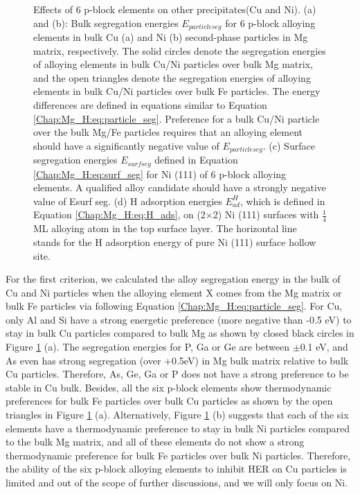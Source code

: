 \begin{figure}[!ht]
\caption[Effects of 6 p-block elements on other precipitates(Cu and Ni).]{Effects of 6 p-block elements on other precipitates(Cu and Ni). (a) and (b): Bulk segregation energies $E_{particle seg}$ for 6 p-block alloying elements in bulk Cu (a) and Ni (b) second-phase particles in Mg matrix, respectively. The solid circles denote the segregation energies of alloying elements in bulk Cu/Ni particles over bulk Mg matrix, and the open triangles denote the segregation energies of alloying elements in bulk Cu/Ni particles over bulk Fe particles. The energy differences are defined in equations similar to Equation \ref{Chap:Mg_H:eq:particle_seg}. Preference for a bulk Cu/Ni particle over the bulk Mg/Fe particles requires that an alloying element should have a significantly negative value of $E_{particle seg}$. (c) Surface segregation energies $E_{surf seg}$ defined in Equation \ref{Chap:Mg_H:eq:surf_seg} for Ni (111) of 6 p-block alloying elements. A qualified alloy candidate should have a strongly negative value of Esurf seg. (d) H adsorption energies $E_{ad}^H$, which is defined in Equation \ref{Chap:Mg_H:eq:H_ads}, on (2$\times$2) Ni (111) surfaces with $\frac{1}{4}$ \ac{ML} alloying atom in the top surface layer. The horizontal line stands for the H adsorption energy of pure Ni (111) surface hollow site.}
  \label{Chap:Mg_H:fig12}
\end{figure}
\endgroup

For the first criterion, we calculated the alloy segregation energy in the bulk of Cu and Ni particles when the alloying element X comes from the Mg matrix or bulk Fe particles via following Equation \ref{Chap:Mg_H:eq:particle_seg}. For Cu, only Al and Si have a strong energetic preference (more negative than -0.5 eV) to stay in bulk Cu particles compared to bulk Mg as shown by closed black circles in Figure \ref{Chap:Mg_H:fig12} (a). The segregation energies for P, Ga or Ge are between $\pm$0.1 eV, and As even has strong segregation (over +0.5eV) in Mg bulk matrix relative to bulk Cu particles.  Therefore, As, Ge, Ga or P does not have a strong preference to be stable in Cu bulk. Besides, all the six p-block elements show thermodynamic preferences for bulk Fe particles over bulk Cu particles as shown by the open triangles in Figure \ref{Chap:Mg_H:fig12} (a). Alternatively, Figure \ref{Chap:Mg_H:fig12} (b) suggests that each of the six elements have a thermodynamic preference to stay in bulk Ni particles compared to the bulk Mg matrix, and all of these elements do not show a strong thermodynamic preference for bulk Fe particles over bulk Ni particles. Therefore, the ability of the six p-block alloying elements to inhibit HER on Cu particles is limited and out of the scope of further discussions, and we will only focus on Ni.



